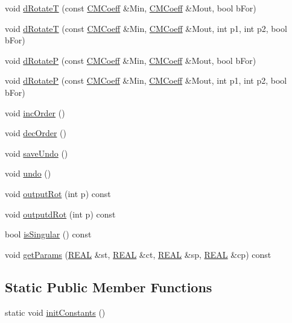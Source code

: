 \begin{DoxyCompactItemize}
void \hyperlink{classCRotCoeff_a73c21837871db96b643b0e9ccf77a6b4}{d\-Rotate\-T} (const \hyperlink{classCMCoeff}{C\-M\-Coeff} \&Min, \hyperlink{classCMCoeff}{C\-M\-Coeff} \&Mout, bool b\-For)
\item 
void \hyperlink{classCRotCoeff_ab40b0a7225f78c026e488950545a33d6}{d\-Rotate\-T} (const \hyperlink{classCMCoeff}{C\-M\-Coeff} \&Min, \hyperlink{classCMCoeff}{C\-M\-Coeff} \&Mout, int p1, int p2, bool b\-For)
\item 
void \hyperlink{classCRotCoeff_a8fc43b5ba7290e8f59fe124105445542}{d\-Rotate\-P} (const \hyperlink{classCMCoeff}{C\-M\-Coeff} \&Min, \hyperlink{classCMCoeff}{C\-M\-Coeff} \&Mout, bool b\-For)
\item 
void \hyperlink{classCRotCoeff_a88d3ed40239b588e18399c549509f687}{d\-Rotate\-P} (const \hyperlink{classCMCoeff}{C\-M\-Coeff} \&Min, \hyperlink{classCMCoeff}{C\-M\-Coeff} \&Mout, int p1, int p2, bool b\-For)
\item 
void \hyperlink{classCRotCoeff_a1416603a77ab7c9b7af515a7bad684f1}{inc\-Order} ()
\item 
void \hyperlink{classCRotCoeff_ae9fa83e941510deeda3aac1b8aecc58b}{dec\-Order} ()
\item 
void \hyperlink{classCRotCoeff_acf2c3650570013fee7e54491fa1d5920}{save\-Undo} ()
\item 
void \hyperlink{classCRotCoeff_a976ea6ff504912701f549e988fd217dc}{undo} ()
\item 
void \hyperlink{classCRotCoeff_a505db8551887fabe49b0f7b6076c2060}{output\-Rot} (int p) const 
\item 
void \hyperlink{classCRotCoeff_a23dff497ccb1ca53dba01af9a27fdab8}{outputd\-Rot} (int p) const 
\item 
bool \hyperlink{classCRotCoeff_a4668070c3eacacf17be98bc2fb348287}{is\-Singular} () const 
\item 
void \hyperlink{classCRotCoeff_a27b0198e460737ea20601fa4f0667df5}{get\-Params} (\hyperlink{util_8h_a5821460e95a0800cf9f24c38915cbbde}{R\-E\-A\-L} \&st, \hyperlink{util_8h_a5821460e95a0800cf9f24c38915cbbde}{R\-E\-A\-L} \&ct, \hyperlink{util_8h_a5821460e95a0800cf9f24c38915cbbde}{R\-E\-A\-L} \&sp, \hyperlink{util_8h_a5821460e95a0800cf9f24c38915cbbde}{R\-E\-A\-L} \&cp) const 
\end{DoxyCompactItemize}
\subsection*{Static Public Member Functions}
\begin{DoxyCompactItemize}
\item 
static void \hyperlink{classCRotCoeff_aa51371c84f373916cd8e35031b38cb52}{init\-Constants} ()
\end{DoxyCompactItemize}


